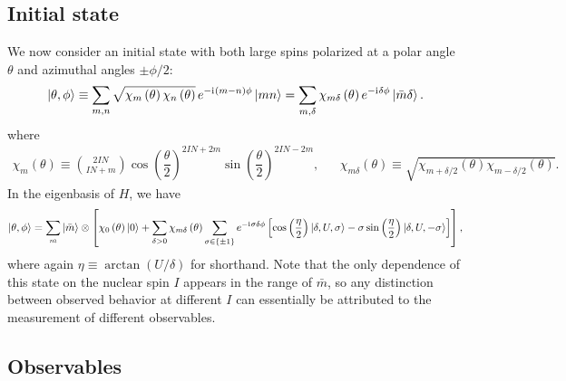 \documentclass[nofootinbib,notitlepage,11pt]{revtex4-2}
\newcommand{\f}[2]{\dfrac{#1}{#2}} %
\newcommand{\p}[1]{\left(#1\right)} %
\renewcommand{\sp}[1]{\left[#1\right]} %
\renewcommand{\set}[1]{\left\{#1\right\}} %
\renewcommand{\i}{\mathrm{i}\mkern1mu} %
\newcommand{\1}{\mathds{1}}
\begin{document}
\subsection{Initial state}

We now consider an initial state with both large spins polarized at a polar angle $\theta$ and azimuthal angles $\pm\phi/2$:
\begin{align}
  \ket{\theta,\phi} \equiv \sum_{m,n}
  \sqrt{\chi_m\p{\theta} \chi_n\p{\theta}} \,
  e^{-\i\p{m-n}\phi} \ket{mn}
  = \sum_{m,\delta}
  \chi_{m\delta}\p{\theta} e^{-\i\delta\phi}
  \ket{\bar m\delta}.
\end{align}
where
\begin{align}
  \chi_m\p\theta \equiv { 2IN \choose IN + m }
  \cos\p{\f{\theta}{2}}^{2IN+2m} \sin\p{\f{\theta}{2}}^{2IN-2m},
  &&
  \chi_{m\delta}\p\theta
  \equiv \sqrt{\chi_{m+\delta/2}\p\theta \chi_{m-\delta/2}\p\theta}.
\end{align}
In the eigenbasis of $H$, we have
\begin{align}
  \ket{\theta,\phi} = \sum_m \ket{\bar m} \otimes
  \sp{\chi_0\p\theta \ket{0}
    + \sum_{\delta>0} \chi_{m\delta}\p\theta
    \sum_{\sigma\in\set{\pm1}} e^{-\i\sigma\delta\phi}
    \sp{\cos\p{\f{\eta}{2}} \ket{\delta,U,\sigma}
    - \sigma\sin\p{\f{\eta}{2}} \ket{\delta,U,-\sigma}}},
\end{align}
where again $\eta\equiv\arctan\p{U/\delta}$ for shorthand.
Note that the only dependence of this state on the nuclear spin $I$ appears in the range of $\bar m$, so any distinction between observed behavior at different $I$ can essentially be attributed to the measurement of different observables.

\subsection{Observables}
\end{document}
